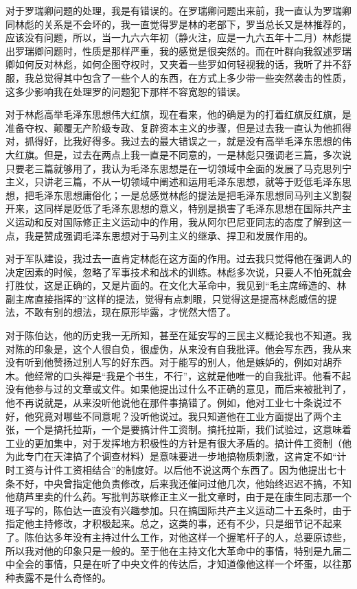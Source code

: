 \begin{maonote}
对于罗瑞卿问题的处理，我是有错误的。在罗瑞卿问题出来前，我一直认为罗瑞卿同林彪的关系是不会坏的，我一直觉得罗是林的老部下，罗当总长又是林推荐的，应该没有问题，所以，当一九六六年初（静火注，应是一九六五年十二月）林彪提出罗瑞卿问题时，性质是那样严重，我的感觉是很突然的。而在叶群向我叙述罗瑞卿如何反对林彪，如何企图夺权时，又夹着一些罗如何轻视我的话，我听了并不舒服，我总觉得其中包含了一些个人的东西，在方式上多少带一些突然袭击的性质，这多少影响我在处理罗的问题犯下那样不容宽恕的错误。

对于林彪高举毛泽东思想伟大红旗，现在看来，他的确是为的打着红旗反红旗，是准备夺权、颠覆无产阶级专政、复辟资本主义的步骤，但是过去我一直认为他抓得对，抓得好，比我好得多。我过去的最大错误之一，就是没有高举毛泽东思想的伟大红旗。但是，过去在两点上我一直是不同意的，一是林彪只强调老三篇，多次说只要老三篇就够用了，我认为毛泽东思想是在一切领域中全面的发展了马克思列宁主义，只讲老三篇，不从一切领域中阐述和运用毛泽东思想，就等于贬低毛泽东思想，把毛泽东思想庸俗化；一是总感觉林彪的提法是把毛泽东思想同马列主义割裂开来，这同样是贬低了毛泽东思想的意义，特别是损害了毛泽东思想在国际共产主义运动和反对国际修正主义运动中的作用，我从阿尔巴尼亚同志的态度了解到这一点，我是赞成强调毛泽东思想对于马列主义的继承、捍卫和发展作用的。

对于军队建设，我过去一直肯定林彪在这方面的作用。过去我只觉得他在强调人的决定因素的时候，忽略了军事技术和战术的训练。林彪多次说，只要人不怕死就会打胜仗，这是正确的，又是片面的。在文化大革命中，我见到“毛主席缔造的、林副主席直接指挥的”这样的提法，觉得有点刺眼，只觉得这是提高林彪威信的提法，不敢有别的想法，现在原形毕露，才恍然大悟了。

对于陈伯达，他的历史我一无所知，甚至在延安写的三民主义概论我也不知道。我对陈的印象是，这个人很自负，很虚伪，从来没有自我批评。他会写东西，我从来没有听到他赞扬过别人写的好东西。对于能写的别人，他是嫉妒的，例如对胡乔木。他经常的口头禅是“我是个书生，不行”，这就是他唯一的自我批评。他看不起没有他参与过的文章或文件。如果他提出过什么不正确的意见，而后来被批判了，他不再说就是，从来没听他说他在那件事搞错了。例如，他对工业七十条说过不好，他究竟对哪些不同意呢？没听他说过。我只知道他在工业方面提出了两个主张，一个是搞托拉斯，一个是要搞计件工资制。搞托拉斯，我们试验过，这意味着工业的更加集中，对于发挥地方积极性的方针是有很大矛盾的。搞计件工资制（他为此专门在天津搞了个调查材料）是意味要进一步地搞物质刺激，这肯定不如“计时工资与计件工资相结合”的制度好。以后他不说这两个东西了。因为他提出七十条不好，中央曾指定他负责修改，后来我还催问过他几次，他始终迟迟不搞，不知他葫芦里卖的什么药。写批判苏联修正主义一批文章时，由于是在康生同志那一个班子写的，陈伯达一直没有兴趣参加。只在搞国际共产主义运动二十五条时，由于指定他主持修改，才积极起来。总之，这类的事，还有不少，只是细节记不起来了。陈伯达多年没有主持过什么工作，对他这样一个握笔杆子的人，总要原谅些，所以我对他的印象只是一般的。至于他在主持文化大革命中的事情，特别是九届二中全会的事情，只是在听了中央文件的传达后，才知道像他这样一个坏蛋，以往那种表露不是什么奇怪的。


\end{maonote}
